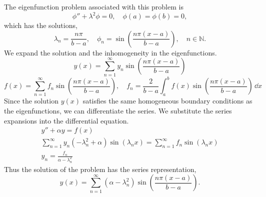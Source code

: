 {%
\begin{Solution}
  The eigenfunction problem associated with this problem is
  \[
  \phi'' + \lambda^2 \phi = 0, \quad \phi(a) = \phi(b) = 0,
  \]
  which has the solutions,
  \[
  \lambda_n = \frac{n \pi}{b-a}, \quad
  \phi_n = \sin \left( \frac{ n \pi (x-a) }{ b-a } \right), \quad
  n \in \mathbb{N}.
  \]
  We expand the solution and the inhomogeneity in the eigenfunctions.
  \[
  y(x) = \sum_{n = 1}^\infty y_n \sin \left( \frac{ n \pi (x-a) }{ b-a } \right)
  \]
  \[
  f(x) = \sum_{n = 1}^\infty f_n \sin \left( \frac{ n \pi (x-a) }{ b-a } \right), \quad
  f_n = \frac{2}{b-a} \int_a^b f(x) \sin \left( \frac{ n \pi (x-a) }{ b-a }
  \right) \,\dd x
  \]
  Since the solution $y(x)$ satisfies the same homogeneous boundary conditions
  as the eigenfunctions, we can differentiate the series.  We substitute
  the series expansions into the differential equation.
  \begin{gather*}
    y'' + \alpha y = f(x) \\
    \sum_{n = 1}^\infty y_n \left( -\lambda_n^2 + \alpha \right)
    \sin \left( \lambda_n x \right)
    = \sum_{n = 1}^\infty f_n \sin \left( \lambda_n x \right) \\
    y_n = \frac{ f_n }{ \alpha - \lambda_n^2 }
  \end{gather*}
  Thus the solution of the problem has the series representation,
  \[
  \boxed{
    y(x) = \sum_{n = 1}^\infty \left( \alpha - \lambda_n^2 \right)
    \sin \left( \frac{ n \pi (x-a) }{ b-a } \right).
    }
  \]
\end{Solution}



}
